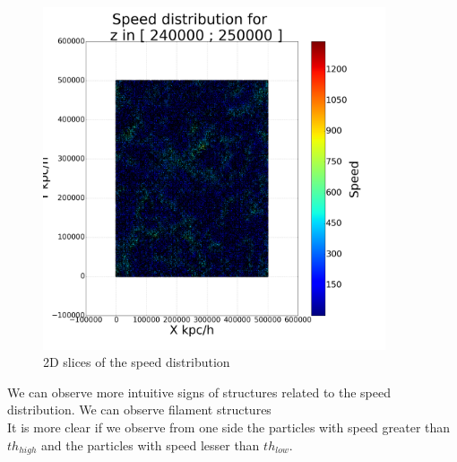 \documentclass[12pt]{article}
\begin{document}
\begin{figure}[ht]
\begin{minipage}{.45\textwidth}
\end{minipage}
\begin{minipage}{.45\textwidth}
  \centering
  \includegraphics[width=0.9\textwidth]{graphs/scatter_magnitud_vel250000.png}
\end{minipage}
\caption{2D slices of the speed distribution}\label{fig:2D_slices}
\end{figure}
\FloatBarrier


We can observe more intuitive signs of structures related to the speed distribution. 
We can observe filament structures\\

It is more clear if we observe from one side the particles with speed greater than $th_{high}$ and the particles with speed lesser than $th_{low}$.\\

\end{document}
